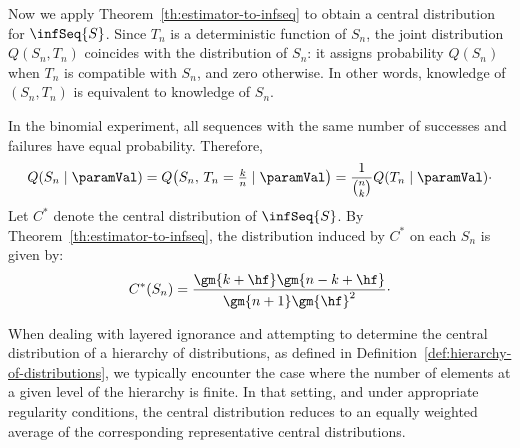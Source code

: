 \begin{example}
    Now we apply Theorem~\ref{th:estimator-to-infseq} to obtain a central distribution for $\infSeq{S}$.
    Since $T_n$ is a deterministic function of $S_n$, the joint distribution $Q(S_n, T_n)$ coincides with the
    distribution of $S_n$: it assigns probability $Q(S_n)$ when $T_n$ is compatible with $S_n$, and zero otherwise.
    In other words, knowledge of $(S_n, T_n)$ is equivalent to knowledge of $S_n$.

    In the binomial experiment, all sequences with the same number of successes and failures have equal probability.
    Therefore,
    \[
        Q(S_n \mid \pv)
        = Q\!\left(S_n,\, T_n = \tfrac{k}{n} \mid \pv\right)
        = \frac{1}{\binom{n}{k}} Q(T_n \mid \pv) \cdot
    \]
    Let $C^*$ denote the central distribution of $\infSeq{S}$.
    By Theorem~\ref{th:estimator-to-infseq}, the distribution induced by $C^*$ on each $S_n$ is given by:
    \begin{equation*}
        C^*(S_n)
        = \frac{\gm{k+\hf} \gm{n-k+\hf}}{\gm{n+1}\gm{\hf}^2} \cdot
    \end{equation*}
\end{example}

When dealing with layered ignorance and attempting to determine the central distribution of a hierarchy of
distributions, as defined in Definition~\ref{def:hierarchy-of-distributions}, we typically encounter the case where the number of
elements at a given level of the hierarchy is finite.
In that setting, and under appropriate regularity conditions,
the central distribution reduces to an equally weighted average of the corresponding representative central
distributions.